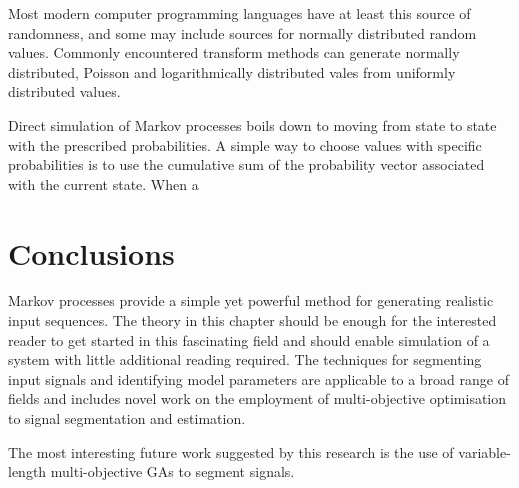 Most modern computer programming languages have at least this source
of randomness, and some may include sources for normally distributed
random values.  Commonly encountered transform methods can generate
normally distributed, Poisson and logarithmically distributed vales
from uniformly distributed values.~\citep{gamerman.lopes2006markov}

Direct simulation of Markov processes boils down to moving from state
to state with the prescribed probabilities.  A simple way to choose
values with specific probabilities is to use the cumulative sum of the
probability vector associated with the current state.  When a 

\section{Conclusions}
Markov processes provide a simple yet powerful method for generating
realistic input sequences.  The theory in this chapter should be
enough for the interested reader to get started in this fascinating
field and should enable simulation of a system with little additional
reading required.  The techniques for segmenting input signals and
identifying model parameters are applicable to a broad range of fields
and includes novel work on the employment of multi-objective
optimisation to signal segmentation and estimation.

The most interesting future work suggested by this research is the use
of variable-length multi-objective GAs to segment signals.



